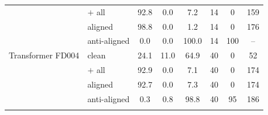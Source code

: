 \begin{tabular}{llcccccc}
 & $+$ all & 92.8 & 0.0 & 7.2 & 14 & 0 & 159 \\
 & aligned & 98.8 & 0.0 & 1.2 & 14 & 0 & 176 \\
 & anti-aligned & 0.0 & 0.0 & 100.0 & 14 & 100 & -- \\
\addlinespace[2pt]
Transformer FD004 & clean & 24.1 & 11.0 & 64.9 & 40 & 0 & 52 \\
 & $+$ all & 92.9 & 0.0 & 7.1 & 40 & 0 & 174 \\
 & aligned & 92.7 & 0.0 & 7.3 & 40 & 0 & 174 \\
 & anti-aligned & 0.3 & 0.8 & 98.8 & 40 & 95 & 186 \\
\addlinespace[2pt]
\bottomrule\end{tabular}
